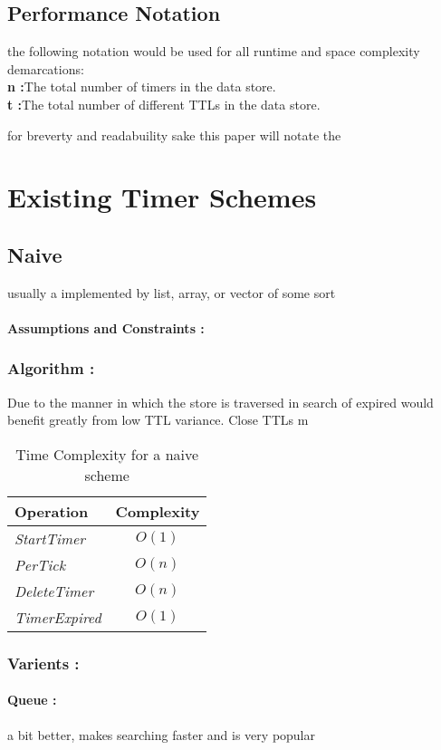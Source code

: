 \documentclass[twocolumn,a4paper]{article}
\newcommand{\complexity}[5]{
\begin{table}[h!]
	\begin{center}
		\begin{tabular}{l|c}
			\textbf{Operation} & \textbf{Complexity} \\
			\hline
			\textit{StartTimer} & $O(#1)$  \\
			\textit{PerTick} & $O(#2)$ \\
			\textit{DeleteTimer} & $O(#3)$ \\
			\textit{TimerExpired} & $O(#4)$ \\
		\end{tabular}
		\caption{Time Complexity for #5 scheme}
	\end{center}
\end{table}
}
\begin{document}

\subsection{Performance Notation}

the following notation would be used for all runtime and space complexity demarcations: \\
\indent\textbf{n :}The total number of timers in the data store.\\
\indent\textbf{t :}The total number of different TTLs in the data store. \\

\vspace{15mm}



for breverty and readabuility sake this paper will notate the 

\section{Existing Timer Schemes}


\subsection{Naive}

usually a implemented by list, array, or vector of some sort
\paragraph{Assumptions and Constraints :}

\subsubsection{Algorithm :}

Due to the manner in which the store is traversed in search of expired would benefit greatly from low TTL variance. Close TTLs m

\complexity{1}{n}{n}{1}{a naive}




\subsubsection{Varients :}

\paragraph{Queue :}
a bit better, makes searching faster and is very popular
\end{document}
